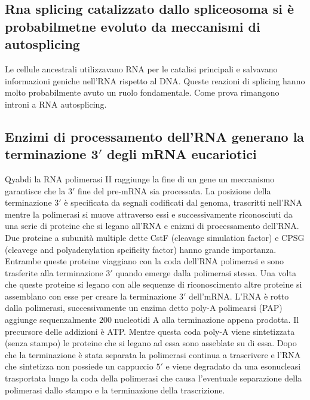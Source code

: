 \subsection{Rna splicing catalizzato dallo spliceosoma si \`e probabilmetne evoluto da meccanismi di autosplicing}
Le cellule ancestrali utilizzavano RNA  per le catalisi principali e salvavano informazioni geniche nell'RNA rispetto al DNA. Queste reazioni di splicing hanno molto probabilmente avuto
un ruolo fondamentale. Come prova rimangono introni a RNA autosplicing. 
\subsection{Enzimi di processamento dell'RNA generano la terminazione $\mathbf{3'}$ degli mRNA eucariotici}
Qyabdi la RNA polimerasi II raggiunge la fine di un gene un meccanismo garantisce che la $3'$ fine del pre-mRNA sia processata. La posizione della terminazione $3'$ \`e specificata da
segnali codificati dal genoma, trascritti nell'RNA mentre la polimerasi si muove attraverso essi e successivamente riconosciuti da una serie di proteine che si legano all'RNA e 
enizmi di processamento dell'RNA. Due proteine a subunit\`a multiple dette CstF (cleavage simulation factor) e CPSG (cleavege and polyadenylation spcificity factor) hanno grande 
importanza. Entrambe queste proteine viaggiano con la coda dell'RNA polimerasi e sono trasferite alla terminazione $3'$ quando emerge dalla polimerasi stessa. Una volta che queste
proteine si legano con alle sequenze di riconoscimento altre proteine si assemblano con esse per creare la terminazione $3'$ dell'mRNA. L'RNA \`e rotto dalla polimerasi, successivamente
un enzima detto poly-A polimearsi (PAP) aggiunge sequenzalmente $200$ nucleotidi A alla terminazione appena prodotta. Il precursore delle addizioni \`e ATP. Mentre questa coda poly-A
viene sintetizzata (senza stampo) le proteine che si legano ad essa sono asseblate su di essa. Dopo che la terminazione \`e stata separata la polimerasi continua a trascrivere e l'RNA
che sintetizza non possiede un cappuccio $5'$ e viene degradato da una esonucleasi trasportata lungo la coda della polimerasi che causa l'eventuale separazione della polimerasi dallo
stampo e la terminazione della trascrizione.
